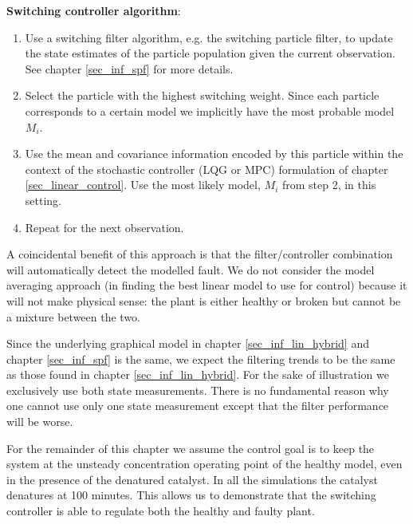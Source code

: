 \textbf{Switching controller algorithm}:
\begin{enumerate}
\item
Use a switching filter algorithm, e.g. the switching particle filter, to update the state estimates of the particle population given the current observation. See chapter \ref{sec_inf_spf} for more details.
\item
Select the particle with the highest switching weight. Since each particle corresponds to a certain model we implicitly have the most probable model $M_i$.
\item
Use the mean and covariance information encoded by this particle within the context of the stochastic controller (LQG or MPC) formulation of chapter \ref{sec_linear_control}. Use the most likely model, $M_i$ from step 2, in this setting.
\item
Repeat for the next observation. 
\end{enumerate} 
A coincidental benefit of this approach is that the filter/controller combination will automatically detect the modelled fault. We do not consider the model averaging approach (in finding the best linear model to use for control) because it will not make physical sense: the plant is either healthy or broken but cannot be a mixture between the two.

Since the underlying graphical model in chapter \ref{sec_inf_lin_hybrid} and chapter \ref{sec_inf_spf} is the same, we expect the filtering trends to be the same as those found in chapter \ref{sec_inf_lin_hybrid}. For the sake of illustration we exclusively use both state measurements. There is no fundamental reason why one cannot use only one state measurement except that the filter performance will be worse.

For the remainder of this chapter we assume the control goal is to keep the system at the unsteady concentration operating point of the healthy model, even in the presence of the denatured catalyst. In all the simulations the catalyst denatures at 100 minutes. This allows us to demonstrate that the switching controller is able to regulate both the healthy and faulty plant. 

